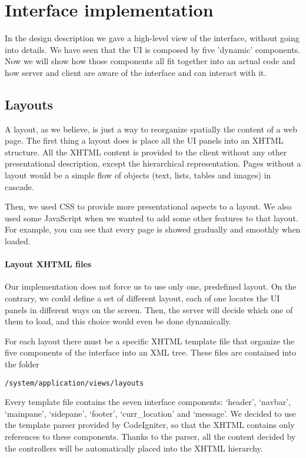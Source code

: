 \section{Interface implementation}
In the design description we gave a high-level view of the interface, without going into details. We have seen that the UI is composed by five 'dynamic' components. Now we will show how those components all fit together into an actual code and how server and client are aware of the interface and can interact with it.

\subsection{Layouts}
A layout, as we believe, is just a way to reorganize spatially the content of a web page. The first thing a layout does is place all the UI panels into an XHTML structure. All the XHTML content is provided to the client without any other presentational description, except the hierarchical representation. Pages without a layout would be a simple flow of objects (text, lists, tables and images) in cascade.

Then, we used CSS to provide more presentational aspects to a layout. We also used some JavaScript when we wanted to add some other features to that layout. For example, you can see that every page is showed gradually and smoothly when loaded.

\paragraph{Layout XHTML files}
Our implementation does not force us to use only one, predefined layout. On the contrary, we could define a set of different layout, each of one locates the UI panels in different ways on the screen. Then, the server will decide which one of them to load, and this choice would even be done dynamically.

For each layout there must be a specific XHTML template file that organize the five components of the interface into an XML tree. These files are contained into the folder
\begin{verbatim}
/system/application/views/layouts
\end{verbatim}
Every template file contains the seven interface components: `header', `navbar', `mainpane', `sidepane', `footer', `curr\_location' and `message'. We decided to use the template parser provided by CodeIgniter, so that the XHTML contains only references to these components. Thanks to the parser, all the content decided by the controllers will be automatically placed into the XHTML hierarchy.

